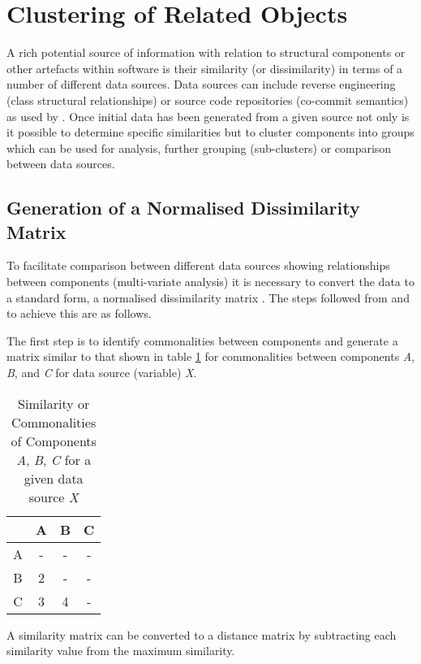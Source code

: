 \section{Clustering of Related Objects}\label{lit-clustering}

A rich potential source of information with relation to structural components or other artefacts within software is their similarity (or dissimilarity) in terms of a number of different data sources. Data sources can include reverse engineering (class structural relationships) or source code repositories (co-commit semantics) as used by \citep{beyer_clustering_2005}. Once initial data has been generated from a given source not only is it possible to determine specific similarities but to cluster components into groups which can be used for analysis, further grouping (sub-clusters) or comparison between data sources.

\subsection{Generation of a Normalised Dissimilarity Matrix}

To facilitate comparison between different data sources showing relationships between components (multi-variate analysis) it is necessary to convert the data to a standard form, a normalised dissimilarity matrix \citep{rogers2011first}. The steps followed from \citet{rogers2011first} and \citet{hongbo2010data} to achieve this are as follows.

The first step is to identify commonalities between components and generate a matrix similar to that shown in table \ref{tab-matrix-similarity} for commonalities between components \textit{A}, \textit{B}, and \textit{C} for data source (variable) \textit{X}.

\begin{table}[H]
\centering
\begin{tabular}{| c || c | c | c |}
\hline
 & A & B & C \\ \hline \hline
A & - & - & - \\
B & 2 & - & - \\ 
C & 3 & 4 & - \\ 
\hline
\end{tabular}
\caption{Similarity or Commonalities of Components \textit{A}, \textit{B}, \textit{C} for a given data source \textit{X}}
\label{tab-matrix-similarity}
\end{table}

A similarity matrix can be converted to a distance matrix by subtracting each similarity value from the maximum similarity.

